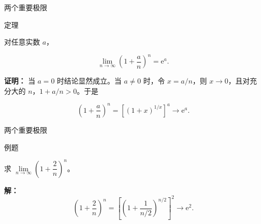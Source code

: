 \documentclass[aspectratio=169,10pt,fontset=fandol]{ctexbeamer}
\newcommand{\ee}{\mathrm{e}}
\begin{document}
\begin{frame}[t,fragile]{两个重要极限}
\normalsize
\begin{block}{定理}
{\normalsize


对任意实数 \(a\)，

\[

\lim_{n\to\infty}\left(1+\frac an\right)^n=\ee^a.

\]


}
\end{block}
\pause
{\normalsize
\textbf{证明：}
当 \(a=0\) 时结论显然成立。当 \(a\neq0\) 时，令 \(x=a/n\)，则 \(x\to0\)，且对充分大的 \(n\)，\(1+a/n>0\)。于是

\[

\left(1+\frac an\right)^n

=\left[(1+x)^{1/x}\right]^a\longrightarrow\ee^a.

\]


}
\end{frame}
\begin{frame}[t,fragile]{两个重要极限}
\normalsize
\begin{block}{例题}
{\normalsize
求 \(\lim\limits_{n\to\infty} \left(1 + \dfrac{2}{n}\right)^n\)。


}
\end{block}
\pause
{\normalsize
\textbf{解：}
\[

	\left(1 + \dfrac{2}{n}\right)^n = \left[\left(1 + \dfrac{1}{n/2}\right)^{n/2}\right]^2 \to \ee^2.

	\]


}
\end{frame}
\end{document}
